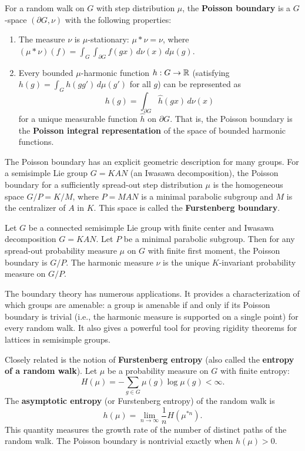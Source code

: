 \begin{definition}
For a random walk on \(G\) with step distribution \(\mu\), the \textbf{Poisson boundary} is a \(G\)-space \((\partial G, \nu)\) with the following properties:
\begin{enumerate}
    \item The measure \(\nu\) is \(\mu\)-stationary: \(\mu * \nu = \nu\), where \((\mu * \nu)(f) = \int_G \int_{\partial G} f(gx) \, d\nu(x) \, d\mu(g)\).
    \item Every bounded \(\mu\)-harmonic function \(h: G \to \mathbb{R}\) (satisfying \(h(g) = \int_G h(gg') \, d\mu(g')\) for all \(g\)) can be represented as
    \[
    h(g) = \int_{\partial G} \widehat{h}(gx) \, d\nu(x)
    \]
    for a unique measurable function \(\widehat{h}\) on \(\partial G\). That is, the Poisson boundary is the \textbf{Poisson integral representation} of the space of bounded harmonic functions.
\end{enumerate}
\end{definition}

The Poisson boundary has an explicit geometric description for many groups. For a semisimple Lie group \(G = KAN\) (an Iwasawa decomposition), the Poisson boundary for a sufficiently spread-out step distribution \(\mu\) is the homogeneous space \(G/P = K/M\), where \(P = MAN\) is a minimal parabolic subgroup and \(M\) is the centralizer of \(A\) in \(K\). This space is called the \textbf{Furstenberg boundary}.

\begin{theorem}[Furstenberg, 1963]
Let \(G\) be a connected semisimple Lie group with finite center and Iwasawa decomposition \(G = KAN\). Let \(P\) be a minimal parabolic subgroup. Then for any spread-out probability measure \(\mu\) on \(G\) with finite first moment, the Poisson boundary is \(G/P\). The harmonic measure \(\nu\) is the unique \(K\)-invariant probability measure on \(G/P\).
\end{theorem}

The boundary theory has numerous applications. It provides a characterization of which groups are amenable: a group is amenable if and only if its Poisson boundary is trivial (i.e., the harmonic measure is supported on a single point) for every random walk. It also gives a powerful tool for proving rigidity theorems for lattices in semisimple groups.

Closely related is the notion of \textbf{Furstenberg entropy} (also called the \textbf{entropy of a random walk}). Let \(\mu\) be a probability measure on \(G\) with finite entropy:
\[
H(\mu) = -\sum_{g \in G} \mu(g) \log \mu(g) < \infty.
\]
The \textbf{asymptotic entropy} (or Furstenberg entropy) of the random walk is
\[
h(\mu) = \lim_{n \to \infty} \frac{1}{n} H(\mu^{*n}).
\]
This quantity measures the growth rate of the number of distinct paths of the random walk. The Poisson boundary is nontrivial exactly when \(h(\mu) > 0\).

